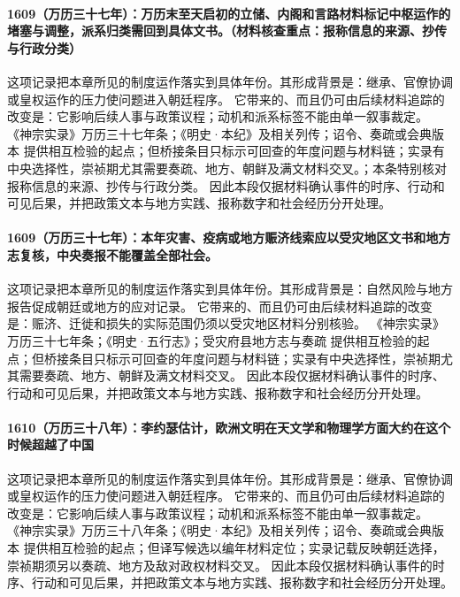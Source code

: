 \paragraph{1609（万历三十七年）：万历末至天启初的立储、内阁和言路材料标记中枢运作的堵塞与调整，派系归类需回到具体文书。（材料核查重点：报称信息的来源、抄传与行政分类）} 这项记录把本章所见的制度运作落实到具体年份。其形成背景是：继承、官僚协调或皇权运作的压力使问题进入朝廷程序。 它带来的、而且仍可由后续材料追踪的改变是：它影响后续人事与政策议程；动机和派系标签不能由单一叙事裁定。 《神宗实录》万历三十七年条；《明史·本纪》及相关列传；诏令、奏疏或会典版本 提供相互检验的起点；但桥接条目只标示可回查的年度问题与材料链；实录有中央选择性，崇祯期尤其需要奏疏、地方、朝鲜及满文材料交叉。；本条特别核对报称信息的来源、抄传与行政分类。 因此本段仅据材料确认事件的时序、行动和可见后果，并把政策文本与地方实践、报称数字和社会经历分开处理。

\paragraph{1609（万历三十七年）：本年灾害、疫病或地方赈济线索应以受灾地区文书和地方志复核，中央奏报不能覆盖全部社会。} 这项记录把本章所见的制度运作落实到具体年份。其形成背景是：自然风险与地方报告促成朝廷或地方的应对记录。 它带来的、而且仍可由后续材料追踪的改变是：赈济、迁徙和损失的实际范围仍须以受灾地区材料分别核验。 《神宗实录》万历三十七年条；《明史·五行志》；受灾府县地方志与奏疏 提供相互检验的起点；但桥接条目只标示可回查的年度问题与材料链；实录有中央选择性，崇祯期尤其需要奏疏、地方、朝鲜及满文材料交叉。 因此本段仅据材料确认事件的时序、行动和可见后果，并把政策文本与地方实践、报称数字和社会经历分开处理。

\paragraph{1610（万历三十八年）：李约瑟估计，欧洲文明在天文学和物理学方面大约在这个时候超越了中国} 这项记录把本章所见的制度运作落实到具体年份。其形成背景是：继承、官僚协调或皇权运作的压力使问题进入朝廷程序。 它带来的、而且仍可由后续材料追踪的改变是：它影响后续人事与政策议程；动机和派系标签不能由单一叙事裁定。 《神宗实录》万历三十八年条；《明史·本纪》及相关列传；诏令、奏疏或会典版本 提供相互检验的起点；但译写候选以编年材料定位；实录记载反映朝廷选择，崇祯期须另以奏疏、地方及敌对政权材料交叉。 因此本段仅据材料确认事件的时序、行动和可见后果，并把政策文本与地方实践、报称数字和社会经历分开处理。

